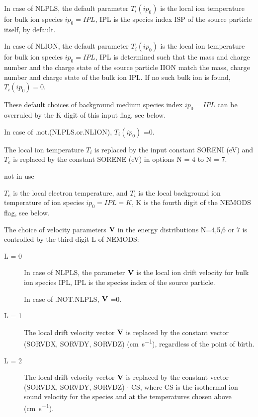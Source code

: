 \begin{description}
\begin{description}
                In case of NLPLS, the default parameter $T_i(ip_0)$ is the local ion
                temperature for bulk ion species $ip_0=IPL$, IPL is the species index ISP of
                the source particle itself, by default.

                In case of NLION, the default parameter $T_i(ip_0)$ is the local ion
                temperature for bulk ion species $ip_0=IPL$, IPL is determined such that the
                mass and charge number and the charge state of the source particle IION match
                the mass, charge number and charge state of the bulk ion IPL.
                If no such bulk ion is found, $T_i(ip_0) = 0$.

                These default choices of background medium species index $ip_0=IPL$ can be
                overruled by the K digit of this input flag, see below.

                In case of .not.(NLPLS.or.NLION), $T_i(ip_0)$ =0.
          \item[M = 1] The local ion temperature $T_i$ is replaced by the input constant
                SORENI (\si{\electronvolt}) and $T_e$ is replaced by the constant SORENE
                (\si{\electronvolt}) in options N = 4 to N = 7.
          \item[M = 2] not in use
          \item[M = 3] $T_e$ is the local electron temperature,
                and $T_i$ is the local background ion temperature of ion species $ip_0 =
                  IPL=K$, K is the fourth digit of the NEMODS flag, see below.

        \end{description}
        The choice of velocity parameters $\mathbf{V}$ in the energy distributions N=4,5,6 or
        7 is controlled by the third digit L of NEMODS:
        \begin{description}
          \item[L = 0] In case of NLPLS, the parameter $\mathbf{V}$ is the local ion drift
                velocity for bulk ion species IPL, IPL is the species index of the source
                particle.

                In case of .NOT.NLPLS, $\mathbf{V}$ =0.
          \item[L = 1] The local drift velocity vector $\mathbf{V} $ is replaced by the constant
                vector (SORVDX, SORVDY, SORVDZ) (\si{\centi\metre\per\second}), regardless of
                the point of birth.

          \item[L = 2] The local drift velocity vector $\mathbf{V} $ is replaced by the constant
                vector (SORVDX, SORVDY, SORVDZ) $ \cdot $ CS, where CS is the isothermal ion
                sound velocity for the species and at the temperatures chosen above
                (\si{\centi\metre\per\second}).


\end{description}
\end{description}
